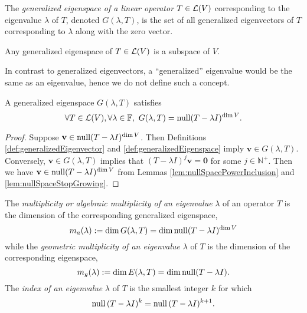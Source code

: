 \begin{defn}
  \label{def:generalizedEigenspace}
  The \emph{generalized eigenspace of a linear operator}
  $T\in{\cal L}(V)$ corresponding to the eigenvalue $\lambda$ of $T$,
  denoted $G(\lambda,T)$, 
  is the set of all generalized eigenvectors of $T$ corresponding
  to $\lambda$ along with the zero vector.
\end{defn}

\begin{rem}
  Any generalized eigenspace of $T\in{\cal L}(V)$
  is a subspace of $V$.
\end{rem}

\begin{rem}
  In contrast to generalized eigenvectors,
  a ``generalized'' eigenvalue would be the same as an eigenvalue,
  hence we do not define such a concept.
\end{rem}

\begin{lem}
  \label{lem:generalizedEigenspace}
  A generalized eigenspace $G(\lambda, T)$ satisfies
  \begin{equation}
    \label{eq:generalizedEigenspace}
    \forall T\in{\cal L}(V), \forall \lambda\in \mathbb{F},\ 
    G(\lambda, T) = \Null(T-\lambda I)^{\dim V}.
  \end{equation}
\end{lem}
\begin{proof}
  Suppose $\mathbf{v}\in \mathrm{null}(T-\lambda I)^{\dim V}$.
  Then Definitions \ref{def:generalizedEigenvector}
  and \ref{def:generalizedEigenspace} imply
  $\mathbf{v}\in G(\lambda,T)$.
  Conversely, $\mathbf{v}\in G(\lambda,T)$ implies
  that $(T-\lambda I)^j \mathbf{v} = \mathbf{0}$
  for some $j\in \mathbb{N}^+$.
  Then we have $\mathbf{v}\in \mathrm{null}(T-\lambda I)^{\dim V}$
  from Lemmas \ref{lem:nullSpacePowerInclusion}
  and \ref{lem:nullSpaceStopGrowing}.
\end{proof}

\begin{defn}
  \label{def:eigenvalueMultiplicity}
  The \emph{multiplicity or algebraic multiplicity
    of an eigenvalue} $\lambda$ of an operator $T$
  is the dimension of the corresponding generalized eigenspace,
  \begin{equation}
    \label{eq:algebraicMultiplicity}
    m_a(\lambda) := \dim G(\lambda, T)
    = \dim \mathrm{null}(T-\lambda I)^{\dim V}
  \end{equation}
  while the \emph{geometric multiplicity
    of an eigenvalue} $\lambda$ of $T$
  is the dimension of the corresponding eigenspace,
  \begin{equation}
    \label{eq:geometricMultiplicity}
    m_g(\lambda) := \dim E(\lambda, T)
    = \dim \mathrm{null}(T-\lambda I).
  \end{equation}
  The \emph{index of an eigenvalue} $\lambda$ of $T$
  is the smallest integer $k$ for which
  \begin{equation}
    \mathrm{null}\,(T-\lambda I)^k = \mathrm{null}\,(T-\lambda I)^{k+1}.
  \end{equation}
\end{defn}

